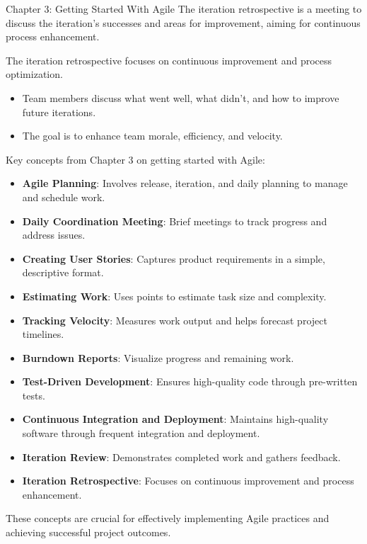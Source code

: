 \begin{notes}{Chapter 3: Getting Started With Agile}
    The iteration retrospective is a meeting to discuss the iteration's successes and areas for improvement, aiming for continuous process enhancement.
    
    \begin{highlight}
    
        The iteration retrospective focuses on continuous improvement and process optimization.
        
        \begin{itemize}
            \item Team members discuss what went well, what didn't, and how to improve future iterations.
            \item The goal is to enhance team morale, efficiency, and velocity.
        \end{itemize}
    
    \end{highlight}
    
    \begin{highlight}
    
        Key concepts from Chapter 3 on getting started with Agile:
        
        \begin{itemize}
            \item \textbf{Agile Planning}: Involves release, iteration, and daily planning to manage and schedule work.
            \item \textbf{Daily Coordination Meeting}: Brief meetings to track progress and address issues.
            \item \textbf{Creating User Stories}: Captures product requirements in a simple, descriptive format.
            \item \textbf{Estimating Work}: Uses points to estimate task size and complexity.
            \item \textbf{Tracking Velocity}: Measures work output and helps forecast project timelines.
            \item \textbf{Burndown Reports}: Visualize progress and remaining work.
            \item \textbf{Test-Driven Development}: Ensures high-quality code through pre-written tests.
            \item \textbf{Continuous Integration and Deployment}: Maintains high-quality software through frequent integration and deployment.
            \item \textbf{Iteration Review}: Demonstrates completed work and gathers feedback.
            \item \textbf{Iteration Retrospective}: Focuses on continuous improvement and process enhancement.
        \end{itemize}
        
        These concepts are crucial for effectively implementing Agile practices and achieving successful project outcomes.
    
    \end{highlight}
\end{notes}

